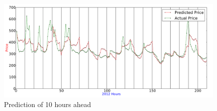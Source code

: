 \begin{figure}[H]
\centering
\includegraphics[width=\linewidth]{billeder/PriceExperimentalAnalysis/10HoursAhead.png}
\caption{Prediction of 10 hours ahead}
\label{fig:10HoursAhead}
\end{figure}

